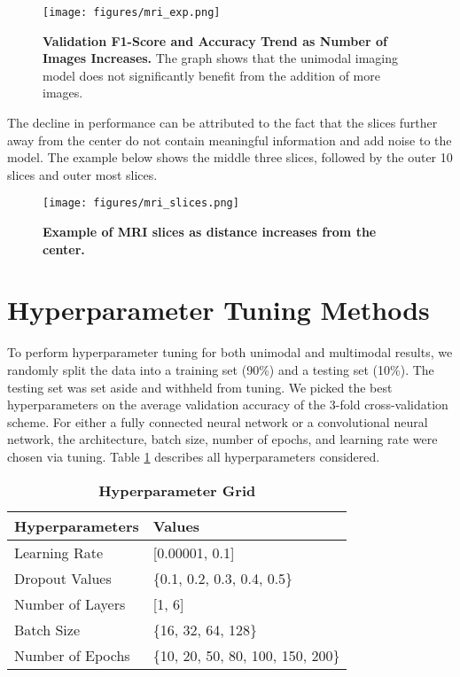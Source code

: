 \begin{figure}[H]
\begin{center}
    \caption{\textbf{Validation F1-Score and Accuracy Trend as Number of Images Increases.} The graph shows that the unimodal imaging model does not significantly benefit from the addition of more images.}
    \label{fig:mri_exp}
  \texttt{[image: figures/mri\_exp.png]}
  \end{center}
\end{figure}

\newpage
\noindent The decline in performance can be attributed to the fact that the slices further away from the center do not contain meaningful information and add noise to the model. The example below shows the middle three slices, followed by the outer 10 slices and outer most slices. 

\begin{figure}[H]
\begin{center}
    \caption{\textbf{Example of MRI slices as distance increases from the center.}}
    \label{fig:mri_slices}
  \texttt{[image: figures/mri\_slices.png]}
  \end{center}
\end{figure}
  

\newpage
\section{Hyperparameter Tuning Methods}
\label{section:hyper}
To perform hyperparameter tuning for both unimodal and multimodal results, we randomly split the data into a training set (90\%) and a testing set (10\%). The testing set was set aside and withheld from tuning. We picked the best hyperparameters on the average validation accuracy of the 3-fold cross-validation scheme. For either a fully connected neural network or a convolutional neural network, the architecture, batch size, number of epochs, and learning rate were chosen via tuning. Table \ref{tab:hyper} describes all hyperparameters considered. 

\begin{table}[H]
\centering
\caption{\textbf{Hyperparameter Grid}}\label{tab:hyper}
\begin{tabular}{|l|l|}
\hline
\textbf{Hyperparameters} & \textbf{Values}                     \\ \hline
Learning Rate            & [0.00001, 0.1]                       \\ \hline
Dropout Values           & \{0.1, 0.2, 0.3, 0.4, 0.5\}      \\ \hline
Number of Layers         & [1, 6]                               \\ \hline
Batch Size               & \{16, 32, 64, 128\}               \\ \hline
Number of Epochs         & \{10, 20, 50, 80, 100, 150, 200\} \\ \hline
\end{tabular}
\end{table}

